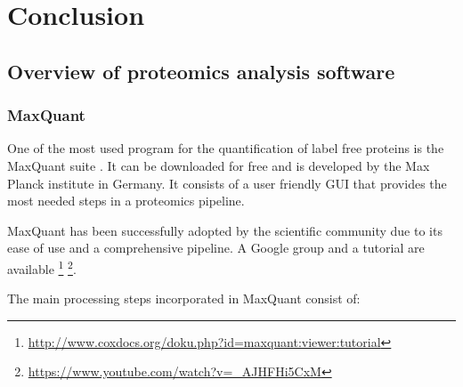 \documentclass[11pt, a4paper]{report}
\begin{document}
\chapter{Conclusion}








\section{Overview of proteomics analysis software}

\subsection{MaxQuant}

One of the most used program for the quantification of label free proteins is the MaxQuant suite \cite{Cox2008}. It can be downloaded for free and is developed by the Max Planck institute in Germany. It consists of a user friendly GUI that provides the most needed steps in a proteomics pipeline.

MaxQuant has been successfully adopted by the scientific community due to its ease of use and a comprehensive pipeline. A Google group and a tutorial are available  \footnote{\href{http://www.coxdocs.org/doku.php?id=maxquant:viewer:tutorial}{http://www.coxdocs.org/doku.php?id=maxquant:viewer:tutorial}} \footnote{\href{https://www.youtube.com/watch?v=\_AJHFHi5CxM}{https://www.youtube.com/watch?v=\_AJHFHi5CxM}}.

The main processing steps incorporated in MaxQuant consist of:
\end{document}

